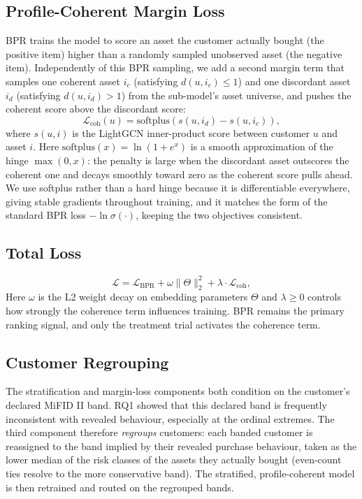 \subsection{Profile-Coherent Margin Loss}
BPR trains the model to score an asset the customer actually bought (the positive item) higher than a randomly sampled unobserved asset (the negative item). Independently of this BPR sampling, we add a second margin term that samples one coherent asset $i_c$ (satisfying $d(u, i_c) \leq 1$) and one discordant asset $i_d$ (satisfying $d(u, i_d) > 1$) from the sub-model's asset universe, and pushes the coherent score above the discordant score:
\begin{equation}
\mathcal{L}_{\text{coh}}(u) = \text{softplus}\!\left(s(u, i_d) - s(u, i_c)\right),
\end{equation}
where $s(u, i)$ is the LightGCN inner-product score between customer $u$ and asset $i$. Here $\text{softplus}(x) = \ln(1 + e^x)$ is a smooth approximation of the hinge $\max(0, x)$: the penalty is large when the discordant asset outscores the coherent one and decays smoothly toward zero as the coherent score pulls ahead. We use softplus rather than a hard hinge because it is differentiable everywhere, giving stable gradients throughout training, and it matches the form of the standard BPR loss $-\ln\sigma(\cdot)$, keeping the two objectives consistent.

\subsection{Total Loss}
\begin{equation}
\mathcal{L} = \mathcal{L}_{\text{BPR}} + \omega \|\Theta\|_2^2 + \lambda \cdot \mathcal{L}_{\text{coh}},
\end{equation}
Here $\omega$ is the L2 weight decay on embedding parameters $\Theta$ and $\lambda \geq 0$ controls how strongly the coherence term influences training. BPR remains the primary ranking signal, and only the treatment trial activates the coherence term.

\subsection{Customer Regrouping}
\label{sec:rq3:regrouping}
The stratification and margin-loss components both condition on the customer's declared MiFID II band. RQ1 showed that this declared band is frequently inconsistent with revealed behaviour, especially at the ordinal extremes. The third component therefore \emph{regroups} customers: each banded customer is reassigned to the band implied by their revealed purchase behaviour, taken as the lower median of the risk classes of the assets they actually bought (even-count ties resolve to the more conservative band). The stratified, profile-coherent model is then retrained and routed on the regrouped bands.

